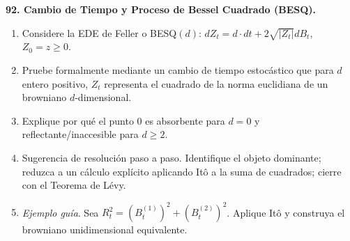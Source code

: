 \documentclass[11pt, letterpaper]{article}
\begin{document}
\newpage

\begin{ejercicio}
    \textbf{92. Cambio de Tiempo y Proceso de Bessel Cuadrado (BESQ).}
    \begin{enumerate}
        \item Considere la EDE de Feller o BESQ$(d)$: $dZ_t = d \cdot dt + 2\sqrt{|Z_t|} dB_t$, $Z_0 = z \ge 0$.
        \item Pruebe formalmente mediante un cambio de tiempo estocástico que para $d$ entero positivo, $Z_t$ representa el cuadrado de la norma euclidiana de un browniano $d$-dimensional.
        \item Explique por qué el punto 0 es absorbente para $d=0$ y reflectante/inaccesible para $d \ge 2$.
        \item Sugerencia de resolución paso a paso. Identifique el objeto dominante; reduzca a un cálculo explícito aplicando Itô a la suma de cuadrados; cierre con el Teorema de Lévy.
        \item \textit{Ejemplo guía}. Sea $R_t^2 = (B_t^{(1)})^2 + (B_t^{(2)})^2$. Aplique Itô y construya el browniano unidimensional equivalente.
    \end{enumerate}
\end{ejercicio}

\vspace{5mm}
\end{document}
